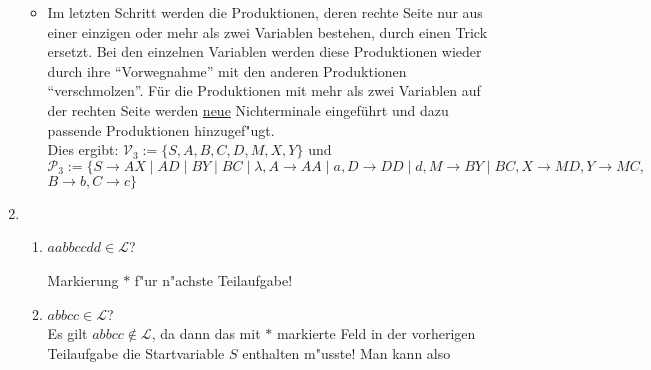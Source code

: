 \documentclass[10pt,oneside,onecolumn,a4paper,german,titlepage]{article}
\begin{document}
\begin{enumerate}
\begin{itemize}
\item Im letzten Schritt werden die Produktionen, deren rechte Seite nur aus einer
einzigen oder mehr als zwei Variablen bestehen, durch einen Trick ersetzt. Bei den
einzelnen Variablen werden diese Produktionen wieder durch ihre ``Vorwegnahme'' mit
den anderen Produktionen ``verschmolzen''. F\"ur die Produktionen mit mehr als zwei
Variablen auf der rechten Seite werden \underline{neue} Nichterminale eingef\"uhrt
und dazu passende Produktionen hinzugef"ugt.\\
Dies ergibt: $\mathcal{V}_3 := \{S,A,B,C,D,M,X,Y\}$ und\\
$\mathcal{P}_3 := \{
S \rightarrow AX \; | \; AD \; | \; BY \; | \; BC \; | \; \lambda, A \rightarrow AA
\; | \; a, D \rightarrow DD \; | \; d, M \rightarrow BY \; | \; BC, X \rightarrow MD,
Y \rightarrow MC,$\\
$B \rightarrow b, C \rightarrow c\}$
\end{itemize}
\item
\begin{enumerate}
\item $aabbccdd \in \mathcal{L}$?
\begin{center}
\end{center}
Markierung $*$ f"ur n"achste Teilaufgabe!
\item $abbcc \in \mathcal{L}$?\\
Es gilt $abbcc \notin \mathcal{L}$, da dann das mit $*$ markierte Feld in der
vorherigen Teilaufgabe die Startvariable $S$ enthalten m"usste! Man kann also

\end{enumerate}
\end{enumerate}
\end{document}
